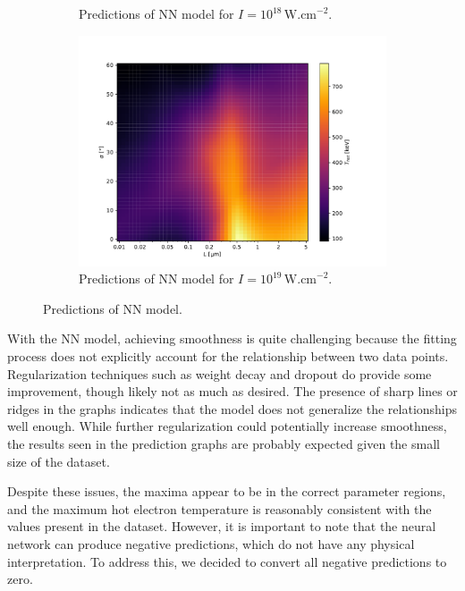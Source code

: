 \begin{figure}[ht]
\begin{subfigure}{0.49\textwidth}
		\caption{Predictions of NN model for $I =  10^{18} \, \mathrm{W.cm}^{-2}$.}
		\label{fig:nn-pred-b}
	\end{subfigure}
	\begin{subfigure}{0.59\textwidth}
		\centering
		\includegraphics[width=\textwidth]{figures/nn19_pred}
		\caption{Predictions of NN model for $I =  10^{19} \, \mathrm{W.cm}^{-2}$.}
		\label{fig:nn-pred-c}
	\end{subfigure}
	\caption{Predictions of NN model.}
	\label{fig:nn-pred}
\end{figure}

With the NN model, achieving smoothness is quite challenging because the fitting process does not explicitly account for the relationship between two data points. Regularization techniques such as weight decay and dropout do provide some improvement, though likely not as much as desired. The presence of sharp lines or ridges in the graphs indicates that the model does not generalize the relationships well enough. While further regularization could potentially increase smoothness, the results seen in the prediction graphs are probably expected given the small size of the dataset.

Despite these issues, the maxima appear to be in the correct parameter regions, and the maximum hot electron temperature is reasonably consistent with the values present in the dataset. However, it is important to note that the neural network can produce negative predictions, which do not have any physical interpretation. To address this, we decided to convert all negative predictions to zero.

